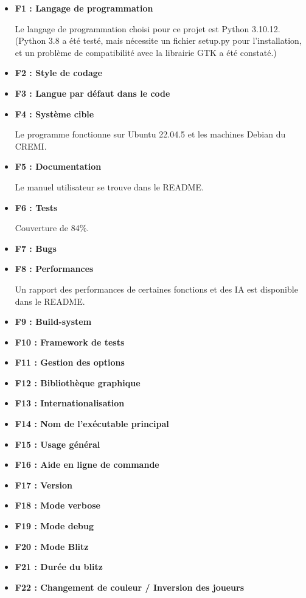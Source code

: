 \documentclass[12pt]{article}
\begin{document}
\bigskip
\begin{itemize}
    \item \textbf{F1 : Langage de programmation}
    
Le langage de programmation choisi pour ce projet est Python 3.10.12. (Python 3.8 a été testé, mais nécessite un fichier setup.py pour l’installation, et un problème de compatibilité avec la librairie GTK a été constaté.)
    \item \textbf{F2 : Style de codage}
    \item \textbf{F3 : Langue par défaut dans le code}
    \item \textbf{F4 : Système cible}
    
    Le programme fonctionne sur Ubuntu 22.04.5 et les machines Debian du CREMI.
    \item \textbf{F5 : Documentation}

    Le manuel utilisateur se trouve dans le README.
    \item \textbf{F6 : Tests}

    Couverture de 84\%.
    \item \textbf{F7 : Bugs}
    \item \textbf{F8 : Performances}
    
    Un rapport des performances de certaines fonctions et des IA est disponible dans le README.
    \item \textbf{F9 : Build-system}
    \item \textbf{F10 : Framework de tests}
    \item \textbf{F11 : Gestion des options}
    \item \textbf{F12 : Bibliothèque graphique}
    \item \textbf{F13 : Internationalisation}
    \item \textbf{F14 : Nom de l'exécutable principal}
    \item \textbf{F15 : Usage général}
    \item \textbf{F16 : Aide en ligne de commande}
    \item \textbf{F17 : Version}
    \item \textbf{F18 : Mode verbose}
    \item \textbf{F19 : Mode debug}
    \item \textbf{F20 : Mode Blitz}
    \item \textbf{F21 : Durée du blitz}
    \item \textbf{F22 : Changement de couleur / Inversion  des joueurs}


\end{itemize}
\end{document}

